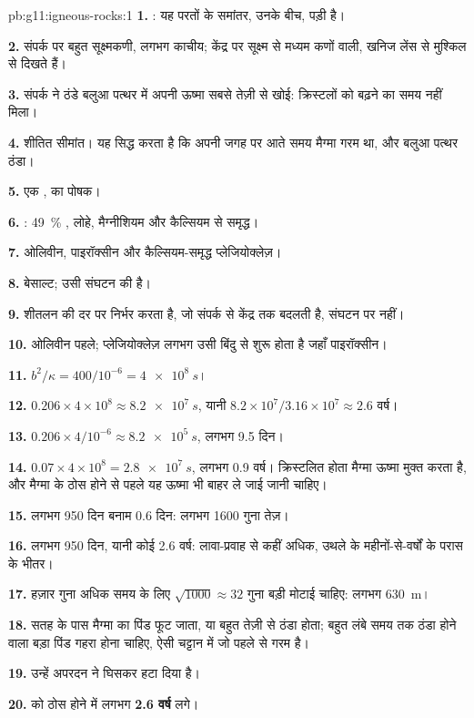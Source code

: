 \begin{solution}{pb:g11:igneous-rocks:1}
\textbf{1.} : यह परतों के समांतर, उनके बीच, पड़ी है।

\textbf{2.} संपर्क पर बहुत सूक्ष्मकणी, लगभग काचीय; केंद्र पर
सूक्ष्म से मध्यम कणों वाली, खनिज लेंस से मुश्किल से दिखते हैं।

\textbf{3.} संपर्क ने ठंडे बलुआ पत्थर में अपनी ऊष्मा सबसे तेज़ी से खोई:
क्रिस्टलों को बढ़ने का समय नहीं मिला।

\textbf{4.} शीतित सीमांत। यह सिद्ध करता है कि अपनी जगह पर आते समय मैग्मा गरम था,
और बलुआ पत्थर ठंडा।

\textbf{5.} एक ,  का पोषक।

\textbf{6.} : \qty{49}{\percent} , लोहे, मैग्नीशियम और
कैल्सियम से समृद्ध।

\textbf{7.} ओलिवीन, पाइरॉक्सीन और कैल्सियम-समृद्ध प्लेजियोक्लेज़।

\textbf{8.} बेसाल्ट; उसी संघटन की   है।

\textbf{9.}  शीतलन की दर पर निर्भर करता है, जो संपर्क से केंद्र तक
बदलती है, संघटन पर नहीं।

\textbf{10.} ओलिवीन पहले; प्लेजियोक्लेज़ लगभग उसी बिंदु से शुरू होता है जहाँ
पाइरॉक्सीन।

\textbf{11.} $b^2/\kappa = 400/10^{-6} = \qty{4e8}{s}$।

\textbf{12.} $0.206 \times 4 \times 10^8 \approx \qty{8.2e7}{s}$, यानी
$8.2 \times 10^7 / 3.16 \times 10^7 \approx 2.6$ वर्ष।

\textbf{13.} $0.206 \times 4/10^{-6} \approx \qty{8.2e5}{s}$, लगभग 9.5
दिन।

\textbf{14.} $0.07 \times 4 \times 10^8 = \qty{2.8e7}{s}$, लगभग 0.9 वर्ष।
क्रिस्टलित होता मैग्मा ऊष्मा मुक्त करता है, और मैग्मा के ठोस होने से पहले
यह ऊष्मा भी बाहर ले जाई जानी चाहिए।

\textbf{15.} लगभग 950 दिन बनाम 0.6 दिन: लगभग 1600 गुना तेज़।

\textbf{16.} लगभग 950 दिन, यानी कोई 2.6 वर्ष: लावा-प्रवाह से कहीं अधिक,
उथले  के महीनों-से-वर्षों के परास के भीतर।

\textbf{17.} हज़ार गुना अधिक समय के लिए $\sqrt{1000} \approx
32$ गुना बड़ी मोटाई चाहिए: लगभग \qty{630}{m}।

\textbf{18.} सतह के पास मैग्मा का पिंड फूट जाता, या बहुत तेज़ी से ठंडा होता;
बहुत लंबे समय तक ठंडा होने वाला बड़ा पिंड गहरा होना चाहिए, ऐसी चट्टान में जो
पहले से गरम है।

\textbf{19.} उन्हें अपरदन ने घिसकर हटा दिया है।

\textbf{20.}  को ठोस होने में लगभग \textbf{2.6 वर्ष} लगे।
\end{solution}
